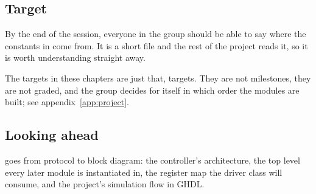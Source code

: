 \subsection*{Target}
By the end of the session, everyone in the group should be able to say where the constants in
 come from. It is a short file and the rest of the project reads it, so it is worth
understanding straight away.

The targets in these chapters are just that, targets. They are not milestones, they are not graded,
and the group decides for itself in which order the modules are built; see
appendix~\ref{app:project}.

\subsection*{Looking ahead}
 goes from protocol to block diagram: the controller's architecture, the top level
every later module is instantiated in, the register map the driver class will consume, and the
project's simulation flow in GHDL.
